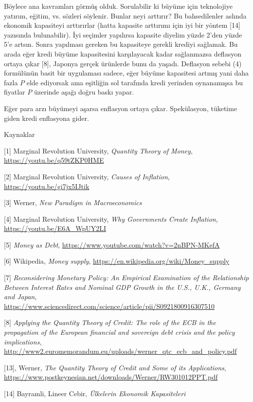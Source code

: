 \documentclass[12pt,fleqn]{article}\usepackage{../../common}
\begin{document}
Böylece ana kavramları görmüş olduk. Sorulabilir ki büyüme için teknolojiye
yatırım, eğitim, vs. sözleri söylenir. Bunlar neyi arttırır? Bu
bahsedilenler aslında ekonomik kapasiteyi arttırırlar (hatta kapasite
arttırımı için iyi bir yöntem [14] yazısında bulunabilir). İyi seçimler
yapılırsa kapasite diyelim yüzde 2'den yüzde 5'e artsın. Sonra yapılması
gereken bu kapasiteye gerekli krediyi sağlamak. Bu arada eğer kredi büyüme
kapasitesini karşılayacak kadar sağlanmazsa deflasyon ortaya çıkar [8],
Japonya gerçek ürünlerde bunu da yaşadı.  Deflasyon sebebi (4) formülünün
basit bir uygulaması sadece, eğer büyüme kapasitesi artmış yani daha fazla
$P$ elde ediyorsak ama eşitliğin sol tarafında kredi yerinden oynanamışsa
bu fiyatlar $P$ üzerinde aşağı doğru baskı yapar.

Eğer para arzı büyümeyi aşarsa enflasyon ortaya çıkar. Spekülasyon,
tüketime giden kredi enflasyona gider.



Kaynaklar

[1] Marginal Revolution University, {\em Quantity Theory of Money}, 
    \url{https://youtu.be/q59tZKP0HME}

[2] Marginal Revolution University, {\em Causes of Inflation}, 
    \url{https://youtu.be/gi7jx5IJtik}

[3] Werner, {\em New Paradigm in Macroeconomics}

[4] Marginal Revolution University, {\em Why Governments Create Inflation}, 
    \url{https://youtu.be/E6A_WpUY2LI}

[5] {\em Money as Debt}, 
    \url{https://www.youtube.com/watch?v=2nBPN-MKefA}

[6] Wikipedia, {\em Money supply}, 
    \url{https://en.wikipedia.org/wiki/Money_supply}

[7] {\em Reconsidering Monetary Policy: An Empirical Examination of the Relationship Between Interest Rates and Nominal GDP Growth in the U.S., U.K., Germany and Japan},
    \url{https://www.sciencedirect.com/science/article/pii/S0921800916307510}

[8] {\em Applying the Quantity Theory of Credit: The role of the ECB in the propagation of the European financial and sovereign debt crisis and the policy implications}, 
   \url{http://www2.euromemorandum.eu/uploads/werner_qtc_ecb_and_policy.pdf}

[13], Werner, {\em The Quantity Theory of Credit and Some of its Applications}, 
     \url{https://www.postkeynesian.net/downloads/Werner/RW301012PPT.pdf}

[14] Bayramli, Lineer Cebir, {\em Ülkelerin Ekonomik  Kapasiteleri}
\end{document}
